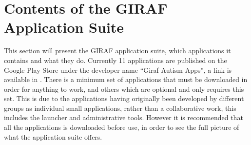 \section{Contents of the GIRAF Application Suite}
This section will present the GIRAF application suite, which applications it contains and what they do.
Currently 11 applications are published on the Google Play Store under the developer name ``Giraf Autism Apps'', a link is available in \cite{GIRAFGOOGLEPLAY}.
There is a minimum set of applications that must be downloaded in order for anything to work, and others which are optional and only requires this set. 
This is due to the applications having originally been developed by different groups as individual small applications, rather than a collaborative work, this includes the launcher and administrative tools.
However it is recommended that all the applications is downloaded before use, in order to see the full picture of what the application suite offers.
